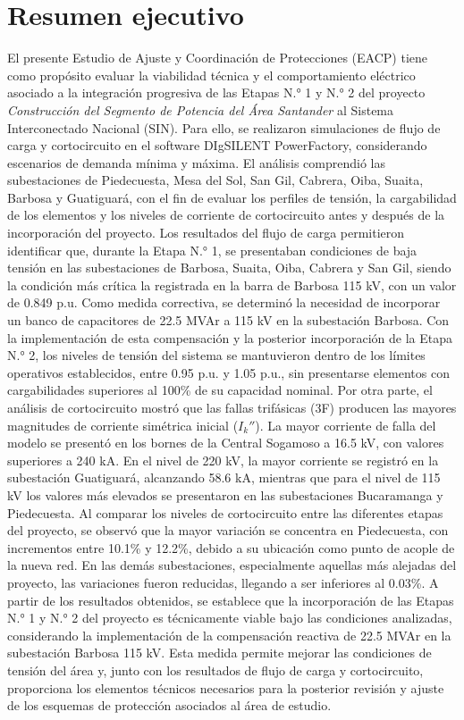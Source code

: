 
\providecommand{\correccion}[1]{\textcolor{pastelblue}{#1}}

\section{Resumen ejecutivo}
El presente Estudio de Ajuste y Coordinación de Protecciones (EACP) tiene como propósito evaluar la viabilidad técnica y el comportamiento eléctrico asociado a la integración progresiva de las Etapas N.° 1 y N.° 2 del proyecto \textit{Construcción del Segmento de Potencia del Área Santander} al Sistema Interconectado Nacional (SIN). Para ello, se realizaron simulaciones de flujo de carga y cortocircuito en el software DIgSILENT PowerFactory, considerando escenarios de demanda mínima y máxima. El análisis comprendió las subestaciones de Piedecuesta, Mesa del Sol, San Gil, Cabrera, Oiba, Suaita, Barbosa y Guatiguará, con el fin de evaluar los perfiles de tensión, la cargabilidad de los elementos y los niveles de corriente de cortocircuito antes y después de la incorporación del proyecto. Los resultados del flujo de carga permitieron identificar que, durante la Etapa N.° 1, se presentaban condiciones de baja tensión en las subestaciones de Barbosa, Suaita, Oiba, Cabrera y San Gil, siendo la condición más crítica la registrada en la barra de Barbosa 115 kV, con un valor de 0.849 p.u. Como medida correctiva, se determinó la necesidad de incorporar un banco de capacitores de 22.5 MVAr a 115 kV en la subestación Barbosa. Con la implementación de esta compensación y la posterior incorporación de la Etapa N.° 2, los niveles de tensión del sistema se mantuvieron dentro de los límites operativos establecidos, entre 0.95 p.u. y 1.05 p.u., sin presentarse elementos con cargabilidades superiores al 100\% de su capacidad nominal. Por otra parte, el análisis de cortocircuito mostró que las fallas trifásicas (3F) producen las mayores magnitudes de corriente simétrica inicial ($I_k''$). La mayor corriente de falla del modelo se presentó en los bornes de la Central Sogamoso a 16.5 kV, con valores superiores a 240 kA. En el nivel de 220 kV, la mayor corriente se registró en la subestación Guatiguará, alcanzando 58.6 kA, mientras que para el nivel de 115 kV los valores más elevados se presentaron en las subestaciones Bucaramanga y Piedecuesta. Al comparar los niveles de cortocircuito entre las diferentes etapas del proyecto, se observó que la mayor variación se concentra en Piedecuesta, con incrementos entre 10.1\% y 12.2\%, debido a su ubicación como punto de acople de la nueva red. En las demás subestaciones, especialmente aquellas más alejadas del proyecto, las variaciones fueron reducidas, llegando a ser inferiores al 0.03\%. A partir de los resultados obtenidos, se establece que la incorporación de las Etapas N.° 1 y N.° 2 del proyecto es técnicamente viable bajo las condiciones analizadas, considerando la implementación de la compensación reactiva de 22.5 MVAr en la subestación Barbosa 115 kV. Esta medida permite mejorar las condiciones de tensión del área y, junto con los resultados de flujo de carga y cortocircuito, proporciona los elementos técnicos necesarios para la posterior revisión y ajuste de los esquemas de protección asociados al área de estudio.

